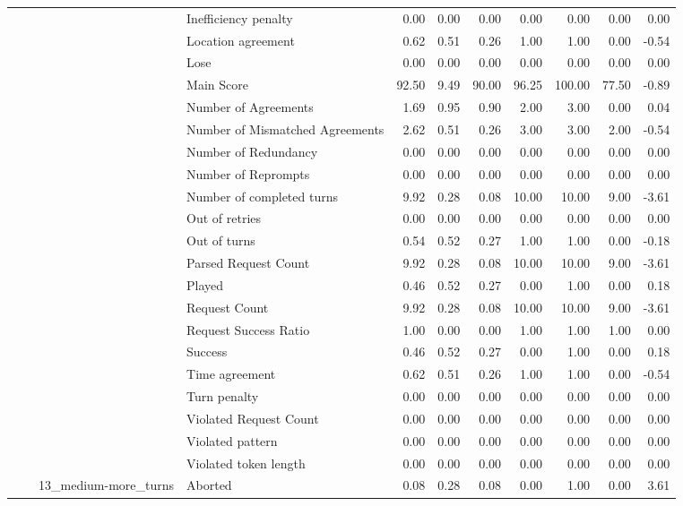 \begin{tabular}{llllrrrrrrr}
 &  &  & Inefficiency penalty & 0.00 & 0.00 & 0.00 & 0.00 & 0.00 & 0.00 & 0.00 \\
 &  &  & Location agreement & 0.62 & 0.51 & 0.26 & 1.00 & 1.00 & 0.00 & -0.54 \\
 &  &  & Lose & 0.00 & 0.00 & 0.00 & 0.00 & 0.00 & 0.00 & 0.00 \\
 &  &  & Main Score & 92.50 & 9.49 & 90.00 & 96.25 & 100.00 & 77.50 & -0.89 \\
 &  &  & Number of Agreements & 1.69 & 0.95 & 0.90 & 2.00 & 3.00 & 0.00 & 0.04 \\
 &  &  & Number of Mismatched Agreements & 2.62 & 0.51 & 0.26 & 3.00 & 3.00 & 2.00 & -0.54 \\
 &  &  & Number of Redundancy & 0.00 & 0.00 & 0.00 & 0.00 & 0.00 & 0.00 & 0.00 \\
 &  &  & Number of Reprompts & 0.00 & 0.00 & 0.00 & 0.00 & 0.00 & 0.00 & 0.00 \\
 &  &  & Number of completed turns & 9.92 & 0.28 & 0.08 & 10.00 & 10.00 & 9.00 & -3.61 \\
 &  &  & Out of retries & 0.00 & 0.00 & 0.00 & 0.00 & 0.00 & 0.00 & 0.00 \\
 &  &  & Out of turns & 0.54 & 0.52 & 0.27 & 1.00 & 1.00 & 0.00 & -0.18 \\
 &  &  & Parsed Request Count & 9.92 & 0.28 & 0.08 & 10.00 & 10.00 & 9.00 & -3.61 \\
 &  &  & Played & 0.46 & 0.52 & 0.27 & 0.00 & 1.00 & 0.00 & 0.18 \\
 &  &  & Request Count & 9.92 & 0.28 & 0.08 & 10.00 & 10.00 & 9.00 & -3.61 \\
 &  &  & Request Success Ratio & 1.00 & 0.00 & 0.00 & 1.00 & 1.00 & 1.00 & 0.00 \\
 &  &  & Success & 0.46 & 0.52 & 0.27 & 0.00 & 1.00 & 0.00 & 0.18 \\
 &  &  & Time agreement & 0.62 & 0.51 & 0.26 & 1.00 & 1.00 & 0.00 & -0.54 \\
 &  &  & Turn penalty & 0.00 & 0.00 & 0.00 & 0.00 & 0.00 & 0.00 & 0.00 \\
 &  &  & Violated Request Count & 0.00 & 0.00 & 0.00 & 0.00 & 0.00 & 0.00 & 0.00 \\
 &  &  & Violated pattern & 0.00 & 0.00 & 0.00 & 0.00 & 0.00 & 0.00 & 0.00 \\
 &  &  & Violated token length & 0.00 & 0.00 & 0.00 & 0.00 & 0.00 & 0.00 & 0.00 \\
\cline{3-11}
 &  & \multirow[t]{27}{*}{13_medium-more_turns} & Aborted & 0.08 & 0.28 & 0.08 & 0.00 & 1.00 & 0.00 & 3.61 \\

\end{tabular}
